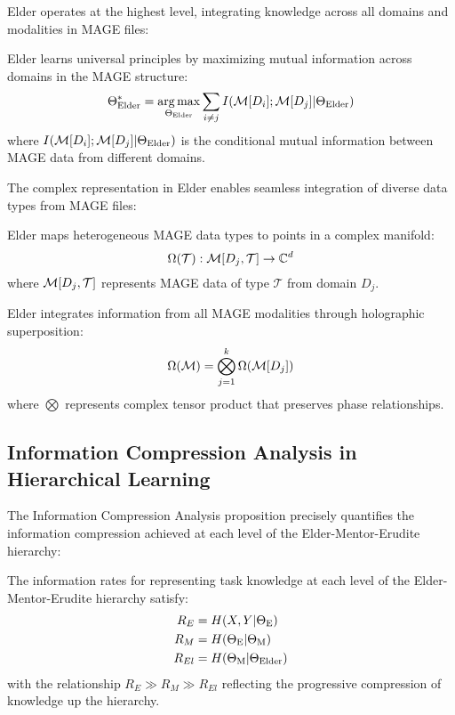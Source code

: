 Elder operates at the highest level, integrating knowledge across all domains and modalities in MAGE files:

\begin{theorem}
Elder learns universal principles by maximizing mutual information across domains in the MAGE structure:
\begin{equation}
\Theta_{\text{Elder}}^* = \mathop{\mathrm{arg\,max}}_{\Theta_{\text{Elder}}} \sum_{i \neq j} I(\mathcal{M}[D_i]; \mathcal{M}[D_j] | \Theta_{\text{Elder}})
\end{equation}
where $I(\mathcal{M}[D_i]; \mathcal{M}[D_j] | \Theta_{\text{Elder}})$ is the conditional mutual information between MAGE data from different domains.
\end{theorem}

The complex representation in Elder enables seamless integration of diverse data types from MAGE files:

\begin{proposition}
Elder maps heterogeneous MAGE data types to points in a complex manifold:
\begin{equation}
\Omega(\mathcal{T}): \mathcal{M}[D_j, \mathcal{T}] \rightarrow \mathbb{C}^{d}
\end{equation}
where $\mathcal{M}[D_j, \mathcal{T}]$ represents MAGE data of type $\mathcal{T}$ from domain $D_j$.
\end{proposition}

\begin{theorem}
Elder integrates information from all MAGE modalities through holographic superposition:
\begin{equation}
\Omega(\mathcal{M}) = \bigotimes_{j=1}^k \Omega(\mathcal{M}[D_j])
\end{equation}
where $\bigotimes$ represents complex tensor product that preserves phase relationships.
\end{theorem}

\subsection{Information Compression Analysis in Hierarchical Learning}

The Information Compression Analysis proposition precisely quantifies the information compression achieved at each level of the Elder-Mentor-Erudite hierarchy:

\begin{proposition}
The information rates for representing task knowledge at each level of the Elder-Mentor-Erudite hierarchy satisfy:
\begin{align}
R_E &= H(X, Y | \Theta_{\text{E}}) \\
R_M &= H(\Theta_{\text{E}} | \Theta_{\text{M}}) \\
R_{El} &= H(\Theta_{\text{M}} | \Theta_{\text{Elder}})
\end{align}
with the relationship $R_E \gg R_M \gg R_{El}$ reflecting the progressive compression of knowledge up the hierarchy.
\end{proposition}

